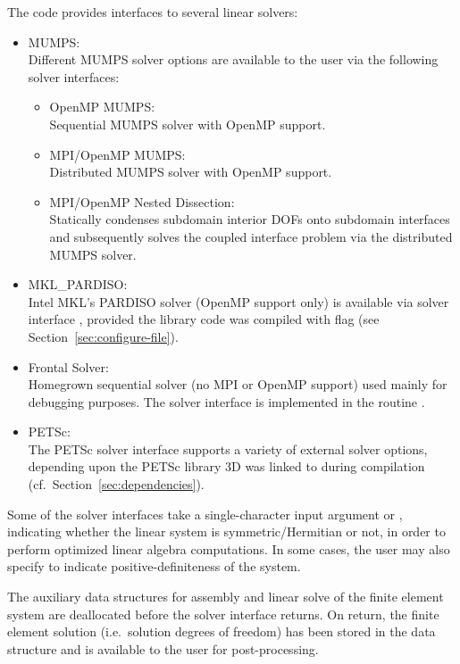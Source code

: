 The code provides interfaces to several linear solvers:
\begin{itemize}
	\item{ MUMPS: \\
		Different MUMPS solver options are available to the user via the following solver interfaces:
		\begin{itemize}
			\item{ OpenMP MUMPS:  \\
			Sequential MUMPS solver with OpenMP support.
			}
			\item{ MPI/OpenMP MUMPS:  \\
			Distributed MUMPS solver with OpenMP support.
			}
			\item{ MPI/OpenMP Nested Dissection:  \\
			Statically condenses subdomain interior DOFs onto subdomain interfaces and subsequently solves the coupled interface problem via the distributed MUMPS solver.
			}
		\end{itemize}
	}
	\item{ MKL\_PARDISO:  \\
		Intel MKL's PARDISO solver (OpenMP support only) is available via solver interface , provided the library code was compiled with flag  (see Section~\ref{sec:configure-file}).
	}
	\item{ Frontal Solver:  \\
		Homegrown sequential solver (no MPI or OpenMP support) used mainly for debugging purposes. The solver interface is implemented in the routine .
	}
	\item{ PETSc:  \\
		The PETSc solver interface supports a variety of external solver options, depending upon the PETSc library \hp3D was linked to during compilation (cf.~Section~\ref{sec:dependencies}).
	}
\end{itemize}
Some of the solver interfaces take a single-character input argument  or , indicating whether the linear system is symmetric/Hermitian or not, in order to perform optimized linear algebra computations. In some cases, the user may also specify  to indicate positive-definiteness of the system.

The auxiliary data structures for assembly and linear solve of the finite element system are deallocated before the solver interface returns. On return, the finite element solution (i.e.~solution degrees of freedom) has been stored in the data structure and is available to the user for post-processing.


